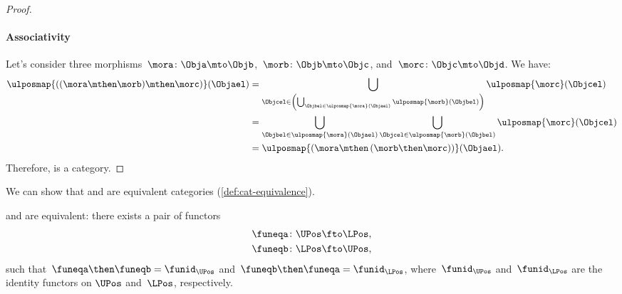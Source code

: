 \begin{proof}
\paragraph*{Associativity} Let's consider three morphisms~$\mora\colon \Obja \mto \Objb$,~$\morb\colon \Objb\mto \Objc$, and~$\morc\colon \Objc\mto \Objd$.
We have:
\begin{equation*}
    \begin{aligned}
    \ulposmap{\left( (\mora \mthen \morb) \mthen \morc\right)}(\Objael)&=
    \bigcup_{\Objcel \in \left( \bigcup_{\Objbel \in \ulposmap{\mora}(\Objael)}\ulposmap{\morb}(\Objbel)\right)}\ulposmap{\morc}(\Objcel)\\
    &=\bigcup_{\Objbel\in \ulposmap{\mora}(\Objael)}\bigcup_{\Objcel\in \ulposmap{\morb}(\Objbel)}\ulposmap{\morc}(\Objcel)\\
    &=\ulposmap{\left( \mora \mthen \left( \morb\then \morc\right)\right)}(\Objael).
    \end{aligned}
\end{equation*}
Therefore, \UPos is a category.
\end{proof}



We can show that \UPos and \LPos are equivalent categories (\cref{def:cat-equivalence}).

\begin{lemma}
\label{lem:ulposequiv}
\UPos and \LPos are equivalent: there exists a pair of functors
\begin{equation}
    \begin{aligned}
    \funeqa\colon \UPos&\fto \LPos,\\
    \funeqb\colon \LPos&\fto \UPos,
    \end{aligned}
\end{equation}
such that~$\funeqa \then \funeqb=\funid_{\UPos}$ and~$\funeqb \then \funeqa=\funid_{\LPos}$, where~$\funid_{\UPos}$ and~$\funid_{\LPos}$ are the identity functors on $\UPos$ and~$\LPos$, respectively.
\end{lemma}

